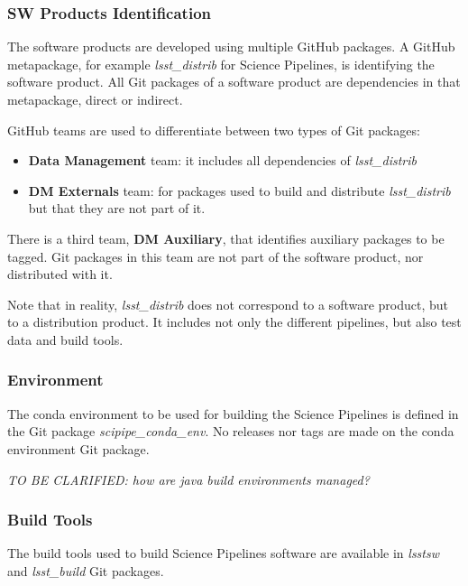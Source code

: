 \subsubsection{SW Products Identification} \label{sec:statusIdentification}

The software products are developed using multiple GitHub packages. 
A GitHub metapackage, for example \textit{lsst\_distrib} for Science Pipelines, is identifying the software product. 
All Git packages of a software product are dependencies in that metapackage, direct or indirect.

GitHub teams are used to differentiate between two types of Git packages:

\begin{itemize}
\item \textbf{Data Management} team: it includes all dependencies of \textit{lsst\_distrib}
\item \textbf{DM Externals} team: for packages used to build and distribute \textit{lsst\_distrib} but that they are not part of it.
\end{itemize}

There is a third team, \textbf{DM Auxiliary}, that identifies auxiliary packages to be tagged.
Git packages in this team are not part of the software product, nor distributed with it.

Note that in reality, \textit{lsst\_distrib} does not correspond to a software product, but to a distribution product.
It includes not only the different pipelines, but also test data and build tools.


\subsubsection{Environment} \label{sec:statusEnvs}

The conda environment to be used for building the Science Pipelines is defined in the Git package \textit{scipipe\_conda\_env}.
No releases nor tags are made  on the conda environment Git package.

\textit{TO BE CLARIFIED: how are java build environments managed?}


\subsubsection{Build Tools} \label{sec:statusTools}

The build tools used to build Science Pipelines software are available in \textit{lsstsw} and \textit{lsst\_build} Git packages.

